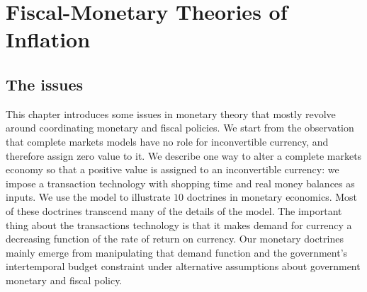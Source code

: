 



{}


%




\chapter{Fiscal-Monetary Theories of Inflation\label{fiscalmonetary}}

\section{The issues}
This chapter introduces some issues in monetary theory that mostly
revolve around coordinating monetary and fiscal policies. We start from
the observation that 
complete markets models have no role for inconvertible currency, and
therefore assign zero value to it.
  We  describe  one way to alter
a complete markets economy so that a positive value is assigned to an
inconvertible currency: we impose a transaction technology
with shopping time and real money balances as inputs.  We
use the model to illustrate $10$ doctrines in monetary economics.
Most of these doctrines transcend many of the details of
the model. The important thing about the transactions
technology is that it makes demand for currency a decreasing
function of the rate of return on currency.  Our monetary
doctrines mainly emerge from manipulating that demand function
and the government's intertemporal budget constraint under
alternative assumptions about government monetary and fiscal
policy.


